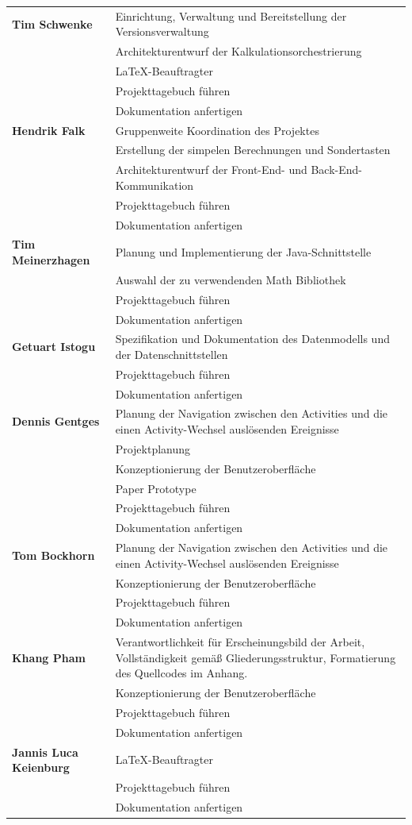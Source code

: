 {\begin{longtable}{|l|p{26em}|}
	\textbf{Tim Schwenke} 
		& Einrichtung, Verwaltung und Bereitstellung der Versionsverwaltung \\
		& Architekturentwurf der Kalkulationsorchestrierung \\
		& LaTeX-Beauftragter \\
		& Projekttagebuch führen \\
		& Dokumentation anfertigen \\
	\hline
	\textbf{Hendrik Falk}
		& Gruppenweite Koordination des Projektes \\
		& Erstellung der simpelen Berechnungen und Sondertasten \\
		& Architekturentwurf der Front-End- und Back-End-Kommunikation \\
		& Projekttagebuch führen \\
		& Dokumentation anfertigen \\
	\hline
 	\textbf{Tim Meinerzhagen}
		& Planung und Implementierung der Java-Schnittstelle \\
		& Auswahl der zu verwendenden Math Bibliothek \\
		& Projekttagebuch führen \\
		& Dokumentation anfertigen \\
	\hline
	\textbf{Getuart Istogu}
		& Spezifikation und Dokumentation des Datenmodells und der Datenschnittstellen \\
		& Projekttagebuch führen \\
		& Dokumentation anfertigen \\
	\hline
	\textbf{Dennis Gentges}
		& Planung der Navigation zwischen den Activities und die einen Activity-Wechsel auslösenden Ereignisse \\
		& Projektplanung \\
		& Konzeptionierung der Benutzeroberfläche \\
		& Paper Prototype \\
		& Projekttagebuch führen \\
		& Dokumentation anfertigen \\
	\hline
	\textbf{Tom Bockhorn}
		& Planung der Navigation zwischen den Activities und die einen Activity-Wechsel auslösenden Ereignisse \\
		& Konzeptionierung der Benutzeroberfläche \\
		& Projekttagebuch führen \\
		& Dokumentation anfertigen \\
	\hline
	\textbf{Khang Pham}
		& Verantwortlichkeit für Erscheinungsbild der Arbeit, Vollständigkeit gemäß Gliederungsstruktur, Formatierung des Quellcodes im Anhang. \\
		& Konzeptionierung der Benutzeroberfläche \\
		& Projekttagebuch führen \\
		& Dokumentation anfertigen \\
	\hline
	\textbf{Jannis Luca Keienburg}
		& LaTeX-Beauftragter \\
		& Projekttagebuch führen \\
		& Dokumentation anfertigen \\
\end{longtable}
}